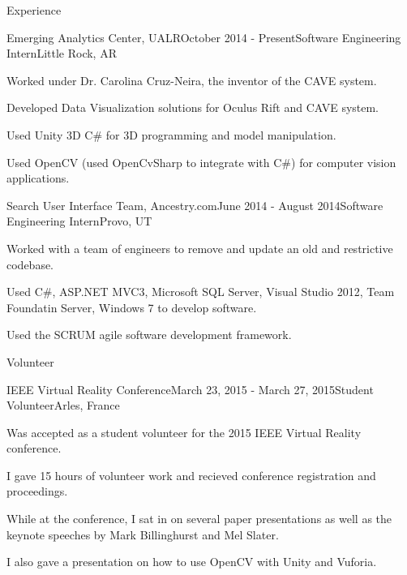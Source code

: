\documentclass{resume} %
\begin{document}
\begin{rSection}{Experience}

\begin{rSubsection}{Emerging Analytics Center, UALR}{October 2014 - Present}{Software Engineering Intern}{Little Rock, AR}

	\item Worked under Dr. Carolina Cruz-Neira, the inventor of the CAVE system.
	\item Developed Data Visualization solutions for Oculus Rift and CAVE system.
	\item Used Unity 3D C\# for 3D programming and model manipulation.
	\item Used OpenCV (used OpenCvSharp to integrate with C\#) for computer vision applications.
\end{rSubsection}

\begin{rSubsection}{Search User Interface Team, Ancestry.com}{June 2014 - August 2014}{Software Engineering Intern}{Provo, UT}

    \item Worked with a team of engineers to remove and update an old and restrictive codebase.
    \item Used C\#, ASP.NET MVC3, Microsoft SQL Server, Visual Studio 2012, Team Foundatin Server, Windows 7 to develop software.
	\item Used the SCRUM agile software development framework.
\end{rSubsection}

\end{rSection}

\begin{rSection}{Volunteer}

	\begin{rSubsection}{IEEE Virtual Reality Conference}{March 23, 2015 - March 27, 2015}{Student Volunteer}{Arles, France}

		\item Was accepted as a student volunteer for the 2015 IEEE Virtual Reality conference.
		\item I gave 15 hours of volunteer work and recieved conference registration and proceedings.
		\item While at the conference, I sat in on several paper presentations as well as the keynote speeches by Mark Billinghurst and Mel Slater.
		\item I also gave a presentation on how to use OpenCV with Unity and Vuforia.
	\end{rSubsection}

\end{rSection}
\end{document}
